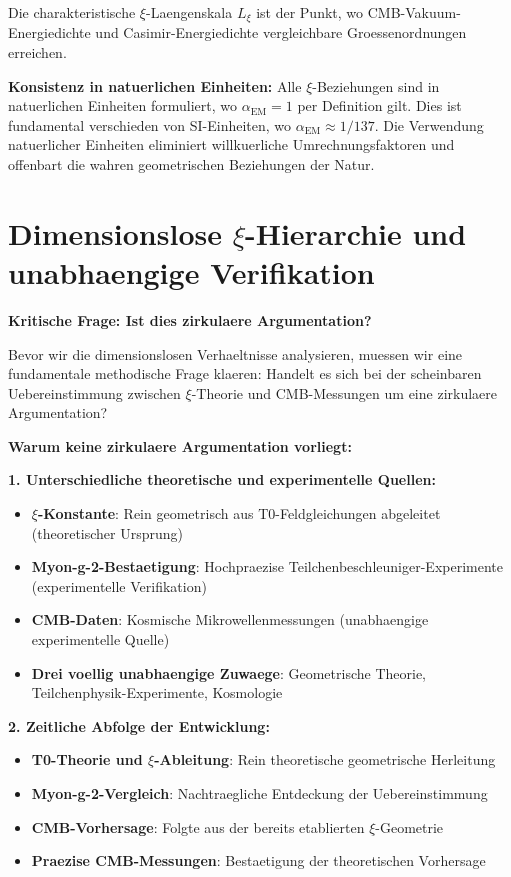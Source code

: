 \documentclass[12pt,a4paper]{article}
\begin{document}
	\begin{important}
		Die charakteristische $\xi$-Laengenskala $L_\xi$ ist der Punkt, wo CMB-Vakuum-Energiedichte und Casimir-Energiedichte vergleichbare Groessenordnungen erreichen.
	\end{important}
	
	\textbf{Konsistenz in natuerlichen Einheiten:}
	Alle $\xi$-Beziehungen sind in natuerlichen Einheiten formuliert, wo $\alpha_{\text{EM}} = 1$ per Definition gilt. Dies ist fundamental verschieden von SI-Einheiten, wo $\alpha_{\text{EM}} \approx 1/137$. Die Verwendung natuerlicher Einheiten eliminiert willkuerliche Umrechnungsfaktoren und offenbart die wahren geometrischen Beziehungen der Natur.
	
	\section{Dimensionslose $\xi$-Hierarchie und unabhaengige Verifikation}
	
	\textbf{Kritische Frage: Ist dies zirkulaere Argumentation?}
	
	Bevor wir die dimensionslosen Verhaeltnisse analysieren, muessen wir eine fundamentale methodische Frage klaeren: Handelt es sich bei der scheinbaren Uebereinstimmung zwischen $\xi$-Theorie und CMB-Messungen um eine zirkulaere Argumentation?
	
	\textbf{Warum keine zirkulaere Argumentation vorliegt:}
	
	\textbf{1. Unterschiedliche theoretische und experimentelle Quellen:}
	\begin{itemize}
		\item \textbf{$\xi$-Konstante}: Rein geometrisch aus T0-Feldgleichungen abgeleitet (theoretischer Ursprung)
		\item \textbf{Myon-g-2-Bestaetigung}: Hochpraezise Teilchenbeschleuniger-Experimente (experimentelle Verifikation)
		\item \textbf{CMB-Daten}: Kosmische Mikrowellenmessungen (unabhaengige experimentelle Quelle)
		\item \textbf{Drei voellig unabhaengige Zuwaege}: Geometrische Theorie, Teilchenphysik-Experimente, Kosmologie
	\end{itemize}
	
	\textbf{2. Zeitliche Abfolge der Entwicklung:}
	\begin{itemize}
		\item \textbf{T0-Theorie und $\xi$-Ableitung}: Rein theoretische geometrische Herleitung
		\item \textbf{Myon-g-2-Vergleich}: Nachtraegliche Entdeckung der Uebereinstimmung 
		\item \textbf{CMB-Vorhersage}: Folgte aus der bereits etablierten $\xi$-Geometrie
		\item \textbf{Praezise CMB-Messungen}: Bestaetigung der theoretischen Vorhersage
	\end{itemize}
	
\end{document}
